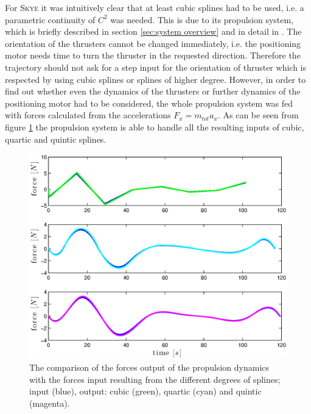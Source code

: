  For \textsc{Skye} it was intuitively clear that at least cubic splines had to be used, i.e. a parametric continuity of $C^2$ was needed. This is due to its propulsion system, which is briefly described in section \ref{sec:system overview} and in detail in \cite{schaffnervu}. The orientation of the thrusters cannot be changed immediately, i.e. the positioning motor needs time to turn the thruster in the requested direction. Therefore the trajectory should not ask for a step input for the orientation of thruster which is respected by using cubic splines or splines of higher degree. However, in order to find out whether even the dynamics of the thrusters or further dynamics of the positioning motor had to be considered, the whole propulsion system was fed with forces calculated from the accelerations $F_x=m_{tot}a_x$. As can be seen from figure \ref{fig:forces} the propulsion system is able to handle all the resulting inputs of cubic, quartic and quintic splines.
 
\begin{figure}[H]
	\centering
    \includegraphics[width = \textwidth]{graphics/forces.eps}
  \caption{The comparison of the forces output of the propulsion dynamics with the forces input resulting from the different degrees of splines; input (blue), output: cubic (green), quartic (cyan) and quintic (magenta).}
\label{fig:forces}
\end{figure} 


